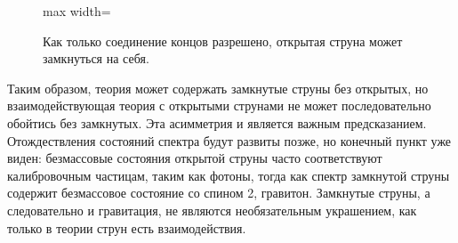 \begin{figure}[H]
  \centering
  \begin{adjustbox}{max width=\linewidth}
  \end{adjustbox}
  \caption{Как только соединение концов разрешено, открытая струна может замкнуться на себя.}
  \label{fig:l02-closed-redraw}
\end{figure}

Таким образом, теория может содержать замкнутые струны без открытых, но взаимодействующая теория с открытыми струнами не может последовательно обойтись без замкнутых. Эта асимметрия и является важным предсказанием. Отождествления состояний спектра будут развиты позже, но конечный пункт уже виден: безмассовые состояния открытой струны часто соответствуют калибровочным частицам, таким как фотоны, тогда как спектр замкнутой струны содержит безмассовое состояние со спином 2, гравитон. Замкнутые струны, а следовательно и гравитация, не являются необязательным украшением, как только в теории струн есть взаимодействия.